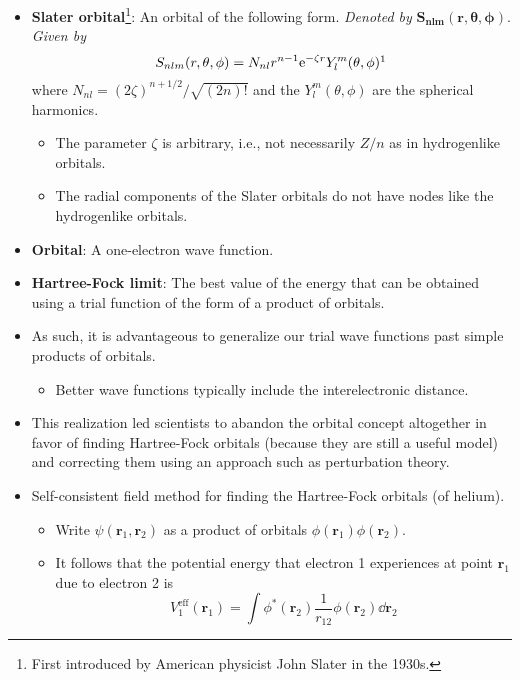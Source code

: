 \documentclass[../notes.tex]{subfiles}
\begin{document}
\begin{itemize}
    \item \textbf{Slater orbital}\footnote{First introduced by American physicist John Slater in the 1930s.}: An orbital of the following form. \emph{Denoted by} $\bm{S_{nlm}(r,\theta,\phi)}$. \emph{Given by}
    \begin{equation*}
        S_{nlm}(r,\theta,\phi) = N_{nl}r^{n-1}\e[-\zeta r]Y_l^m(\theta,\phi)\footnotemark
    \end{equation*}
    where $N_{nl}=(2\zeta)^{n+1/2}/\sqrt{(2n)!}$ and the $Y_l^m(\theta,\phi)$ are the spherical harmonics.
    \begin{itemize}
        \item The parameter $\zeta$ is arbitrary, i.e., not necessarily $Z/n$ as in hydrogenlike orbitals.
        \item The radial components of the Slater orbitals do not have nodes like the hydrogenlike orbitals.
    \end{itemize}
    \item \textbf{Orbital}: A one-electron wave function.
    \item \textbf{Hartree-Fock limit}: The best value of the energy that can be obtained using a trial function of the form of a product of orbitals.
    \item As such, it is advantageous to generalize our trial wave functions past simple products of orbitals.
    \begin{itemize}
        \item Better wave functions typically include the interelectronic distance.
    \end{itemize}
    \item This realization led scientists to abandon the orbital concept altogether in favor of finding Hartree-Fock orbitals (because they are still a useful model) and correcting them using an approach such as perturbation theory.
    \item Self-consistent field method for finding the Hartree-Fock orbitals (of helium).
    \begin{itemize}
        \item Write $\psi(\mathbf{r}_1,\mathbf{r}_2)$ as a product of orbitals $\phi(\mathbf{r}_1)\phi(\mathbf{r}_2)$.
        \item It follows that the potential energy that electron 1 experiences at point $\mathbf{r}_1$ due to electron 2 is
        \begin{equation*}
            V_1^\text{eff}(\mathbf{r}_1) = \int\phi^*(\mathbf{r}_2)\frac{1}{r_{12}}\phi(\mathbf{r}_2)\dd{\mathbf{r}_2}

\end{equation*}
\end{itemize}
\end{itemize}
\end{document}
